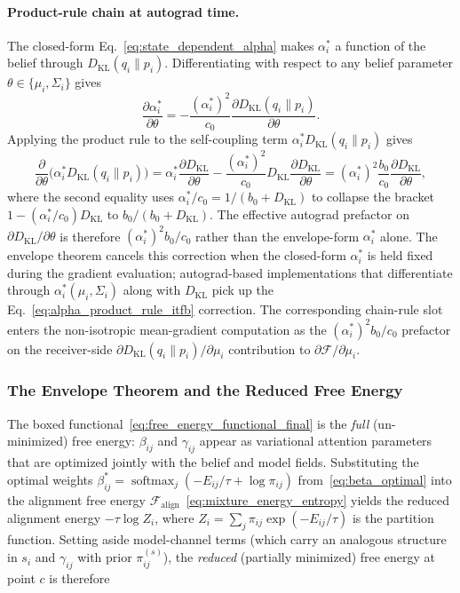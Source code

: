 \documentclass[11pt]{article}
\providecommand{\softmax}{\operatorname{softmax}}
\begin{document}
\paragraph{Product-rule chain at autograd time.}
The closed-form Eq.~\eqref{eq:state_dependent_alpha} makes $\alpha_i^*$ a function of the belief through $D_{\mathrm{KL}}(q_i \| p_i)$. Differentiating with respect to any belief parameter $\theta \in \{\mu_i, \Sigma_i\}$ gives
\begin{equation}
\frac{\partial \alpha_i^*}{\partial \theta} = -\frac{(\alpha_i^*)^2}{c_0} \frac{\partial D_{\mathrm{KL}}(q_i \| p_i)}{\partial \theta}.
\label{eq:alpha_chain_rule_itfb}
\end{equation}
Applying the product rule to the self-coupling term $\alpha_i^* D_{\mathrm{KL}}(q_i \| p_i)$ gives
\begin{equation}
\frac{\partial}{\partial \theta}\bigl(\alpha_i^* D_{\mathrm{KL}}(q_i \| p_i)\bigr) = \alpha_i^* \frac{\partial D_{\mathrm{KL}}}{\partial \theta} - \frac{(\alpha_i^*)^2}{c_0} D_{\mathrm{KL}} \frac{\partial D_{\mathrm{KL}}}{\partial \theta} = (\alpha_i^*)^2 \frac{b_0}{c_0} \frac{\partial D_{\mathrm{KL}}}{\partial \theta},
\label{eq:alpha_product_rule_itfb}
\end{equation}
where the second equality uses $\alpha_i^*/c_0 = 1/(b_0 + D_{\mathrm{KL}})$ to collapse the bracket $1 - (\alpha_i^*/c_0) D_{\mathrm{KL}}$ to $b_0/(b_0 + D_{\mathrm{KL}})$. The effective autograd prefactor on $\partial D_{\mathrm{KL}}/\partial \theta$ is therefore $(\alpha_i^*)^2 b_0/c_0$ rather than the envelope-form $\alpha_i^*$ alone. The envelope theorem cancels this correction when the closed-form $\alpha_i^*$ is held fixed during the gradient evaluation; autograd-based implementations that differentiate through $\alpha_i^*(\mu_i, \Sigma_i)$ along with $D_{\mathrm{KL}}$ pick up the Eq.~\eqref{eq:alpha_product_rule_itfb} correction. The corresponding chain-rule slot enters the non-isotropic mean-gradient computation as the $(\alpha_i^*)^2 b_0/c_0$ prefactor on the receiver-side $\partial D_{\mathrm{KL}}(q_i\|p_i)/\partial\mu_i$ contribution to $\partial\mathcal{F}/\partial\mu_i$.

\subsubsection{The Envelope Theorem and the Reduced Free Energy}
\label{sec:envelope_theorem}

The boxed functional~\eqref{eq:free_energy_functional_final} is the \emph{full} (un-minimized) free energy: $\beta_{ij}$ and $\gamma_{ij}$ appear as variational attention parameters that are optimized jointly with the belief and model fields. Substituting the optimal weights $\beta_{ij}^* = \softmax_j(-E_{ij}/\tau + \log\pi_{ij})$ from~\eqref{eq:beta_optimal} into the alignment free energy $\mathcal{F}_{\text{align}}$~\eqref{eq:mixture_energy_entropy} yields the reduced alignment energy $-\tau\log Z_i$, where $Z_i = \sum_j \pi_{ij}\exp(-E_{ij}/\tau)$ is the partition function. Setting aside model-channel terms (which carry an analogous structure in $s_i$ and $\gamma_{ij}$ with prior $\pi^{(s)}_{ij}$), the \emph{reduced} (partially minimized) free energy at point $c$ is therefore
\end{document}
